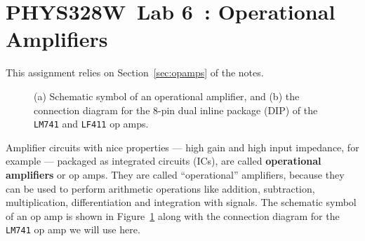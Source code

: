 \documentclass[11pt]{article}
\newcommand{\COURSE}{PHYS328W}
\newcommand{\LABNUM}{6}
\newcommand{\TITLE}{Operational Amplifiers}
\begin{document}
\thispagestyle{empty}

\section*{\COURSE\ Lab \LABNUM\ : \TITLE}

This assignment relies on Section~\ref{sec:opamps} of the notes.

\begin{figure}[ht]
  \begin{center}
    \caption{(a) Schematic symbol of an operational amplifier, and
      (b) the connection diagram for the 8-pin dual inline package
      (DIP) of the \texttt{LM741} and \texttt{LF411} op amps.}
    \label{fig:opamp}
  \end{center}
\end{figure}

Amplifier circuits with nice properties --- high gain and 
high input impedance, for example --- packaged as integrated circuits
(ICs), are called \textbf{operational amplifiers} or op amps. They are
called ``operational'' amplifiers, because they can be used to perform
arithmetic operations like addition, subtraction, multiplication,
differentiation and integration with signals. The 
schematic symbol of an op amp is shown in Figure~\ref{fig:opamp} along
with the connection diagram for the \texttt{LM741} op amp we will use
here.
\end{document}
